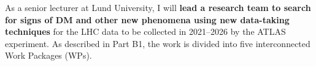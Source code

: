 As a senior lecturer at Lund University, I will \textbf{lead a research team to search for signs of DM and other new phenomena using new data-taking techniques} for the LHC data to be collected in 2021--2026 by the ATLAS experiment. 
As described in Part B1, the work is divided into five interconnected Work Packages (WPs). %


